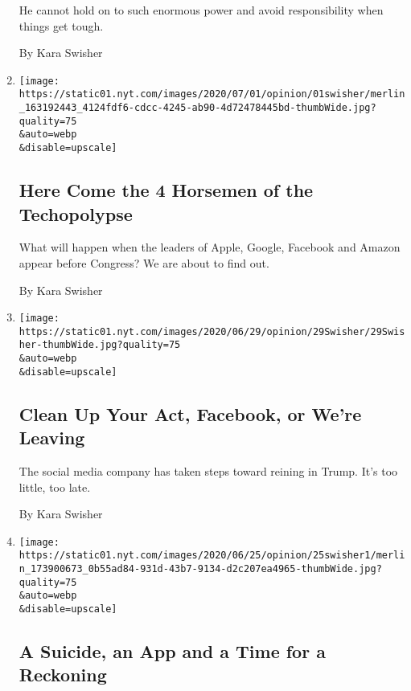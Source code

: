 \begin{enumerate}
  He cannot hold on to such enormous power and avoid responsibility when
  things get tough.

  By Kara Swisher
\item
  \href{/2020/07/01/opinion/anti-trust-tech-hearing-facebook.html}{}

  \texttt{[image: https://static01.nyt.com/images/2020/07/01/opinion/01swisher/merlin\_163192443\_4124fdf6-cdcc-4245-ab90-4d72478445bd-thumbWide.jpg?quality=75\\\&auto=webp\\\&disable=upscale]}

  \hypertarget{here-come-the-4-horsemen-of-the-techopolypse}{%
  \subsection{Here Come the 4 Horsemen of the
  Techopolypse}\label{here-come-the-4-horsemen-of-the-techopolypse}}

  What will happen when the leaders of Apple, Google, Facebook and
  Amazon appear before Congress? We are about to find out.

  By Kara Swisher
\item
  \href{/2020/06/30/opinion/facebook-zuckerberg-labeling.html}{}

  \texttt{[image: https://static01.nyt.com/images/2020/06/29/opinion/29Swisher/29Swisher-thumbWide.jpg?quality=75\\\&auto=webp\\\&disable=upscale]}

  \hypertarget{clean-up-your-act-facebook-or-were-leaving}{%
  \subsection{Clean Up Your Act, Facebook, or We're
  Leaving}\label{clean-up-your-act-facebook-or-were-leaving}}

  The social media company has taken steps toward reining in Trump. It's
  too little, too late.

  By Kara Swisher
\item
  \href{/2020/06/25/opinion/robinhood-suicide-trading.html}{}

  \texttt{[image: https://static01.nyt.com/images/2020/06/25/opinion/25swisher1/merlin\_173900673\_0b55ad84-931d-43b7-9134-d2c207ea4965-thumbWide.jpg?quality=75\\\&auto=webp\\\&disable=upscale]}

  \hypertarget{a-suicide-an-app-and-a-time-for-a-reckoning}{%
  \subsection{A Suicide, an App and a Time for a
  Reckoning}\label{a-suicide-an-app-and-a-time-for-a-reckoning}}


\end{enumerate}
